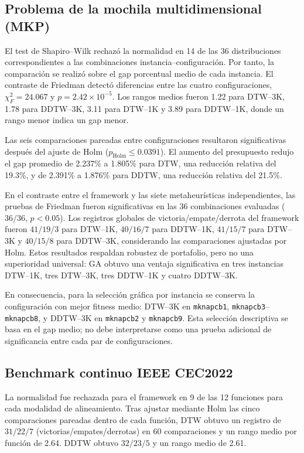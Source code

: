 \subsection{Problema de la mochila multidimensional (MKP)}
\label{sec:estadistico-mkp-es}

El test de Shapiro--Wilk rechaz\'o la normalidad en 14 de las 36 distribuciones
correspondientes a las combinaciones instancia--configuraci\'on. Por tanto, la
comparaci\'on se realiz\'o sobre el gap porcentual medio de cada instancia. El
contraste de Friedman detect\'o diferencias entre las cuatro configuraciones,
$\chi_F^2=24.067$ y $p=2.42\times10^{-5}$. Los rangos medios fueron 1.22 para
DTW--3K, 1.78 para DDTW--3K, 3.11 para DTW--1K y 3.89 para DDTW--1K, donde un
rango menor indica un gap menor.

Las seis comparaciones pareadas entre configuraciones resultaron significativas
despu\'es del ajuste de Holm ($p_{\mathrm{Holm}}\leq0.0391$). El aumento del
presupuesto redujo el gap promedio de 2.237\% a 1.805\% para DTW, una reducci\'on
relativa del 19.3\%, y de 2.391\% a 1.876\% para DDTW, una reducci\'on relativa
del 21.5\%.

En el contraste entre el framework y las siete metaheur\'isticas independientes,
las pruebas de Friedman fueron significativas en las 36 combinaciones evaluadas
($36/36$, $p<0.05$). Los registros globales de victoria/empate/derrota del
framework fueron $41/19/3$ para DTW--1K, $40/16/7$ para DDTW--1K, $41/15/7$
para DTW--3K y $40/15/8$ para DDTW--3K, considerando las comparaciones ajustadas
por Holm. Estos resultados respaldan robustez de portafolio, pero no una
superioridad universal: GA obtuvo una ventaja significativa en tres instancias
DTW--1K, tres DTW--3K, tres DDTW--1K y cuatro DDTW--3K.

En consecuencia, para la selecci\'on gr\'afica por instancia se conserva la
configuraci\'on con mejor fitness medio: DTW--3K en
\texttt{mknapcb1}, \texttt{mknapcb3}--\texttt{mknapcb8}, y DDTW--3K en
\texttt{mknapcb2} y \texttt{mknapcb9}. Esta selecci\'on descriptiva se basa en
el gap medio; no debe interpretarse como una prueba adicional de significancia
entre cada par de configuraciones.

\subsection{Benchmark continuo IEEE CEC2022}
\label{sec:estadistico-cec-es}

La normalidad fue rechazada para el framework en 9 de las 12 funciones para
cada modalidad de alineamiento. Tras ajustar mediante Holm las cinco
comparaciones pareadas dentro de cada funci\'on, DTW obtuvo un registro de
$31/22/7$ (victorias/empates/derrotas) en 60 comparaciones y un rango medio
por funci\'on de 2.64. DDTW obtuvo $32/23/5$ y un rango medio de 2.61.

